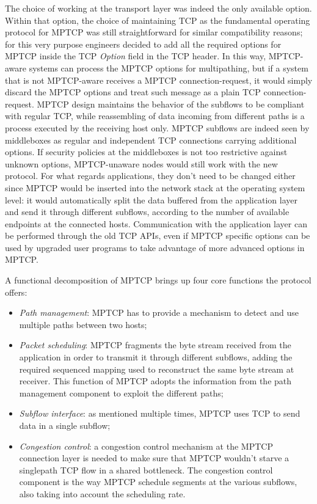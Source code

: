 The choice of working at the transport layer was indeed the only available option. Within that option, the choice of maintaining TCP as the fundamental operating protocol for MPTCP was still straightforward for similar compatibility reasons; for this very purpose engineers decided to add all the required options for MPTCP inside the TCP \textit{Option} field in the TCP header. In this way, MPTCP-aware systems can process the MPTCP options for multipathing, but if a system that is not MPTCP-aware receives a MPTCP connection-request, it would simply discard the MPTCP options and treat such message as a plain TCP connection-request. 
MPTCP design maintains the behavior of the subflows to be compliant with regular TCP, while reassembling of data incoming from different paths is a process executed by the receiving host only. MPTCP subflows are indeed seen by middleboxes as regular and independent TCP connections carrying additional options. If security policies at the middleboxes is not too restrictive against unknown options, MPTCP-unaware nodes would still work with the new protocol.
For what regards applications, they don't need to be changed either since MPTCP would be inserted into the network stack at the operating system level: it would automatically split the data buffered from the application layer and send it through different subflows, according to the number of available endpoints at the connected hosts. Communication with the application layer can be performed through the old TCP APIs, even if MPTCP specific options can be used by upgraded user programs to take advantage of more advanced options in MPTCP.

A functional decomposition of MPTCP brings up four core functions the protocol offers:
\begin{itemize}
  \item \textit{Path management}: MPTCP has to provide a mechanism to detect and use multiple paths between two hosts;
  \item \textit{Packet scheduling}: MPTCP fragments the byte stream received from the application in order to transmit it through different subflows, adding the required sequenced mapping used to reconstruct the same byte stream at receiver. This function of MPTCP adopts the information from the path management component to exploit the different paths;
  \item \textit{Subflow interface}: as mentioned multiple times, MPTCP uses TCP to send data in a single subflow;
  \item \textit{Congestion control}: a congestion control mechanism at the MPTCP connection layer is needed to make sure that MPTCP wouldn't starve a singlepath TCP flow in a shared bottleneck. The congestion control component is the way MPTCP schedule segments at the various subflows, also taking into account the scheduling rate.
\end{itemize}

